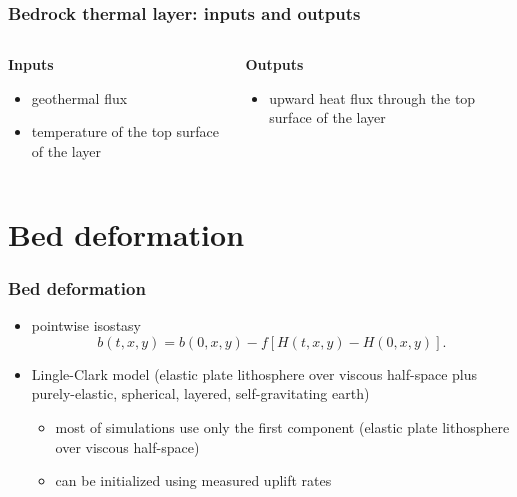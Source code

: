 \documentclass[hide notes,intlimits]{beamer}
\begin{document}

\begin{frame}
  \frametitle{Bedrock thermal layer: inputs and outputs}

  \begin{columns}[t]
    \begin{column}{0.5\linewidth}
      \textbf{Inputs}

      \begin{itemize}
      \item geothermal flux
      \item temperature of the top surface of the layer
      \end{itemize}
    \end{column}
    \begin{column}{0.5\linewidth}
      \textbf{Outputs}

      \begin{itemize}
      \item upward heat flux through the top surface of the layer
      \end{itemize}
    \end{column}
  \end{columns}
\end{frame}

\section{Bed deformation}
\label{sec:bed-deformation}

\begin{frame}
  \frametitle{Bed deformation}

  \begin{itemize}
  \item pointwise isostasy
    \begin{equation}
      \label{eq:9}
      b(t,x,y) = b(0,x,y) - f \left[H(t,x,y) - H(0,x,y)\right].
    \end{equation}
  \item Lingle-Clark model (elastic plate lithosphere over viscous
    half-space plus purely-elastic, spherical, layered,
    self-gravitating earth)

    \begin{itemize}
    \item most of simulations use only the first component (elastic
      plate lithosphere over viscous half-space)
    \item can be initialized using measured uplift rates
    \end{itemize}
  \end{itemize}
\end{frame}
\end{document}
